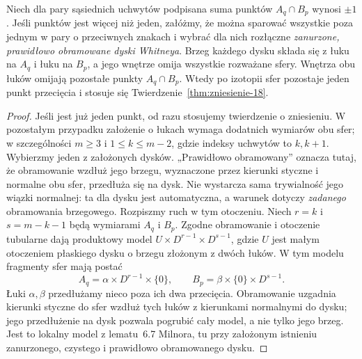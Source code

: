 \begin{stwierdzenie}
\label{prop:whitney-do-zniesienia-18}
Niech dla pary sąsiednich uchwytów
podpisana suma punktów $A_q\cap B_p$
wynosi $\pm1$. Jeśli punktów jest więcej niż jeden,
załóżmy, że można sparować wszystkie poza jednym
w pary o przeciwnych znakach i wybrać dla nich
rozłączne \emph{zanurzone, prawidłowo obramowane
dyski Whitneya}. Brzeg każdego dysku składa się
z łuku na $A_q$ i łuku na $B_p$, a jego wnętrze
omija wszystkie rozważane sfery. Wnętrza obu łuków
omijają pozostałe punkty $A_q\cap B_p$.
Wtedy po izotopii sfer
pozostaje jeden punkt przecięcia
i stosuje się
Twierdzenie~\ref{thm:zniesienie-18}.
\end{stwierdzenie}
\begin{proof}
Jeśli jest już jeden punkt, od razu stosujemy
twierdzenie o zniesieniu. W pozostałym przypadku
założenie o łukach wymaga dodatnich wymiarów obu sfer;
w szczególności $m\geq3$ i $1\leq k\leq m-2$,
gdzie indeksy uchwytów to $k,k+1$.
Wybierzmy jeden z założonych dysków.
„Prawidłowo obramowany” oznacza tutaj, że obramowanie
wzdłuż jego brzegu, wyznaczone przez kierunki
styczne i normalne obu sfer, przedłuża się na dysk.
Nie wystarcza sama trywialność jego wiązki normalnej:
ta dla dysku jest automatyczna, a warunek dotyczy
\emph{zadanego} obramowania brzegowego.
Rozpiszmy ruch w tym otoczeniu. Niech $r=k$ i $s=m-k-1$
będą wymiarami $A_q$ i $B_p$. Zgodne obramowanie i otoczenie
tubularne dają produktowy model
$U\times D^{r-1}\times D^{s-1}$, gdzie $U$ jest małym
otoczeniem płaskiego dysku o brzegu złożonym z dwóch łuków.
W tym modelu fragmenty sfer mają postać
\[
 A_q=\alpha\times D^{r-1}\times\{0\},\qquad
 B_p=\beta\times\{0\}\times D^{s-1}.
\]
Łuki $\alpha,\beta$ przedłużamy nieco poza ich dwa przecięcia.
Obramowanie uzgadnia kierunki styczne do sfer wzdłuż tych łuków
z kierunkami normalnymi do dysku; jego przedłużenie na dysk
pozwala pogrubić cały model, a nie tylko jego brzeg.
Jest to lokalny model z lematu~6.7 Milnora, tu przy założonym
istnieniu zanurzonego, czystego i prawidłowo obramowanego dysku.


\end{proof}
